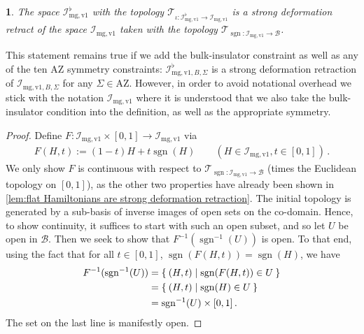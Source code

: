 \documentclass[a4paper,10pt]{article}
\numberwithin{equation}{section}
\theoremstyle{plain}
\theoremstyle{plain}
\newtheorem{lem}[thm]{\protect\lemmaname}
\theoremstyle{plain}
\theoremstyle{plain}
\theoremstyle{plain}
\theoremstyle{remark}
\theoremstyle{definition}
\theoremstyle{plain}
\providecommand{\lemmaname}{Lemma}
\newcommand{\calB}{\mathcal{B}}
\newcommand{\calI}{\mathcal{I}}
\newcommand{\sgn}{\operatorname{sgn}}
\newcommand{\eq}[1]{\begin{align*}#1\end{align*}}
\newcommand{\calT}{\mathcal{T}}
\begin{document}
	\begin{lem}\label{lem:abstract nonsense strong deformation}
		The space $\calI^\flat_{\mathrm{mg,v1}}$ with the topology $\calT_{\iota:\calI^\flat_{\mathrm{mg,v1}}\to\calI_{\mathrm{mg,v1}}}$ is a strong deformation retract of the space $\calI_{\mathrm{mg,v1}}$ taken with the topology $\calT_{\sgn:\calI_{\mathrm{mg,v1}}\to\calB}$. 
	\end{lem}
	This statement remains true if we add the bulk-insulator constraint as well as any of the ten AZ symmetry constraints: $\calI_{\mathrm{mg,v1},B,\Sigma}^\flat$ is a strong deformation retraction of $\calI_{\mathrm{mg,v1},B,\Sigma}$ for any $\Sigma\in\mathrm{AZ}$. However, in order to avoid notational overhead we stick with the notation $\calI_{\mathrm{mg,v1}}$ where it is understood that we also take the bulk-insulator condition into the definition, as well as the appropriate symmetry.
	\begin{proof}
		Define $F:\calI_{\mathrm{mg,v1}}\times[0,1]\to\calI_{\mathrm{mg,v1}}$ via \eq{F(H,t) := (1-t)H+t\sgn(H)\qquad(H\in\calI_{\mathrm{mg,v1}},t\in[0,1])\,.} 
		We only show $F$ is continuous with respect to $\calT_{\sgn:\calI_{\mathrm{mg,v1}}\to\calB}$ (times the Euclidean topology on $[0,1]$), as the other two properties have already been shown in \cref{lem:flat Hamiltonians are strong deformation retraction}. The initial topology is generated by a sub-basis of inverse images of open sets on the co-domain. Hence, to show continuity, it suffices to start with such an open subset, and so let $U$ be open in $\calB$. Then we seek to show that $F^{-1}(\sgn^{-1}(U))$ is open. To that end, using the fact that for all $t\in[0,1]$, $\sgn(F(H,t))=\sgn(H)$, we have \eq{F^{-1}(\sgn^{-1}(U)) & =\Set{(H,t)|\sgn(F(H,t))\in U} \\ &= \Set{(H,t)|\sgn(H)\in U} \\ &= \sgn^{-1}(U)\times [0,1]\,.} The set on the last line is manifestly open.
	\end{proof}
	
\end{document}
